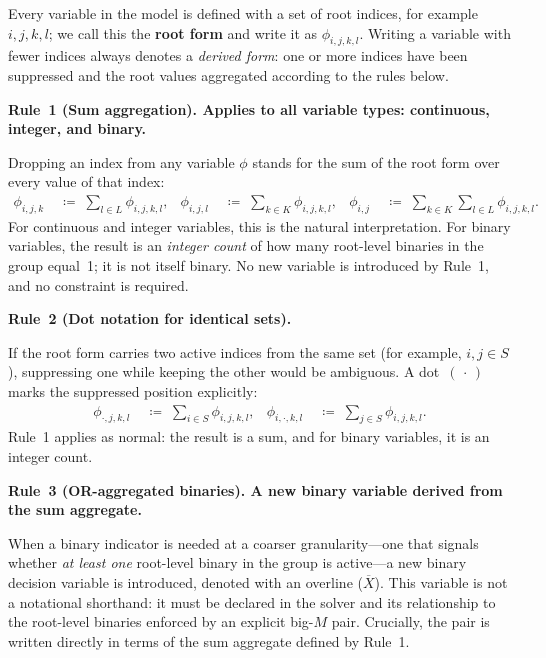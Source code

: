 \begin{convention}
\label{conv:notation}

Every variable in the model is defined with a set of root indices, for example $i, j, k, l$; we call this the \textbf{root form} and write it as $\phi_{i, j, k, l}$.
Writing a variable with fewer indices always denotes a \emph{derived form}: one or more indices have been suppressed and the root values aggregated according to the rules below.

\medskip
\noindent\textbf{Rule~1 (Sum aggregation).
  Applies to all variable types: continuous, integer, and binary.}

Dropping an index from any variable $\phi$ stands for the sum of the root form over every value of that index:
%
\begin{align*}
  \phi_{i, j, k}
    &\;\coloneqq\; \sum_{l\in L} \phi_{i, j, k, l},
  &
  \phi_{i, j, l}
    &\;\coloneqq\; \sum_{k\in K} \phi_{i, j, k, l},
  &
  \phi_{i, j}
    &\;\coloneqq\; \sum_{k\in K}\sum_{l\in L} \phi_{i, j, k, l}.
\end{align*}
%
For continuous and integer variables, this is the natural interpretation.
For binary variables, the result is an \emph{integer count} of how many root-level binaries in the group equal~1; it is not itself binary.
No new variable is introduced by Rule~1, and no constraint is required.

\medskip
\noindent\textbf{Rule~2 (Dot notation for identical sets).}

If the root form carries two active indices from the same set (for example, $i, j \in S$), suppressing one while keeping the other would be ambiguous. A dot~$(\,\cdot\,)$ marks the suppressed position explicitly:
%
\begin{align*}
  \phi_{\cdot, j, k, l}
    &\;\coloneqq\; \sum_{i\in S} \phi_{i, j, k, l},
  &
  \phi_{i, \cdot, k, l}
    &\;\coloneqq\; \sum_{j\in S} \phi_{i, j, k, l}.
\end{align*}
%
Rule~1 applies as normal: the result is a sum, and for binary variables, it is an integer count.

\medskip
\noindent\textbf{Rule~3 (OR-aggregated binaries).
  A new binary variable derived from the sum aggregate.}

When a binary indicator is needed at a coarser granularity---one that signals whether \emph{at least one} root-level binary in the group is active---a new binary decision variable is introduced, denoted with an overline ($\overline{X}$).
This variable is not a notational shorthand: it must be declared in the solver and its relationship to the root-level binaries enforced by an explicit big-$M$ pair.
Crucially, the pair is written directly in terms of the sum aggregate defined by Rule~1.


\end{convention}
